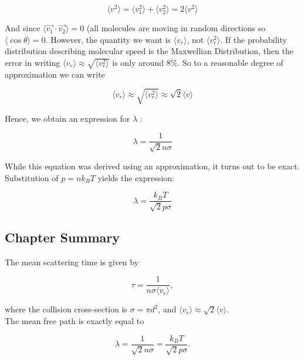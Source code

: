 \documentclass[svgnames]{article}     %
\begin{document}
\[
\langle v^2 \rangle = \langle v_1^2 \rangle + \langle v_2^2 \rangle = 2\langle
v^2 \rangle
\] \vspace{5px}

And since $\langle \vec{v_1} \cdot \vec{v_2} \rangle = 0$ (all molecules are
moving in random directions so $\langle \cos \theta \rangle = 0$. However, the
quantity we want is $\langle v_r \rangle$, not $\langle v_r ^2 \rangle$. If the
probability distribution describing molecular speed is the Maxwellian
Distribution, then the error in writing $\langle v_r \rangle \approx
\sqrt{\langle v_r ^2 \rangle}$ is only around 8\%. So to a reasonable degree of
approximation we can write 

\[
\langle v_r \rangle \approx \sqrt{\langle v_r ^2 \rangle} \approx
\sqrt{2}\langle v \rangle
\] \vspace{5px}

Hence, we obtain an expression for $\lambda$ : 

\[
  \boxed{ \lambda = \frac{1}{\sqrt{2}n\sigma}}
\] \vspace{5px}

While this equation was derived using an approximation, it turns out to be
exact. Substitution of $p = nk_B T$ yields the expression: 

\[
  \lambda = \frac{k_B T}{\sqrt{2}p\sigma}
\] \vspace{5px}


\subsection{Chapter Summary}

The mean scattering time is given by 

\[
\tau = \frac{1}{n\sigma \langle v_r \rangle}, 
\] \vspace{5px}

where the collision cross-section is $\sigma = \pi d^2$, and $\langle v_r
\rangle \approx \sqrt{2}\langle v \rangle$. \\

The mean free path is exactly equal to 

\[
  \lambda = \frac{1}{\sqrt{2}n\sigma} = \frac{k_B T}{\sqrt{2}p\sigma}.
\] \vspace{5px}
\end{document}
